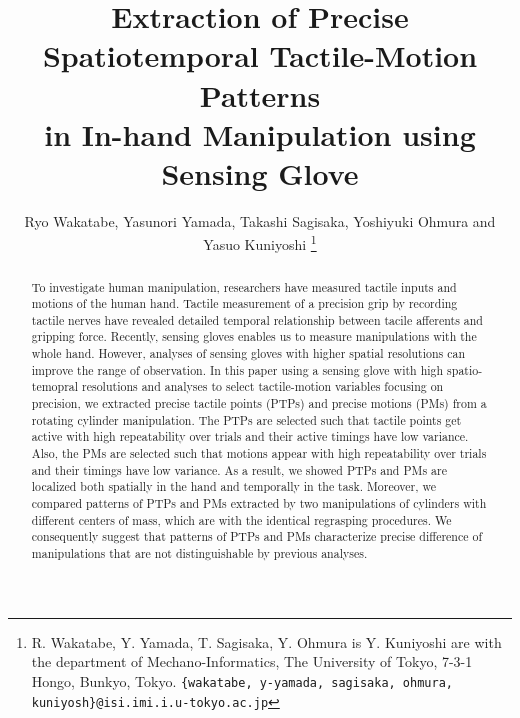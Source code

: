 \documentclass[letterpaper, 10 pt, conference]{IEEEtran}  %
\title{\LARGE \bf
Extraction of Precise Spatiotemporal Tactile-Motion Patterns \\ 
in In-hand Manipulation using Sensing Glove
}
\author{Ryo Wakatabe, Yasunori Yamada, Takashi Sagisaka, Yoshiyuki Ohmura and Yasuo Kuniyoshi%
    \thanks{R. Wakatabe, Y. Yamada, T. Sagisaka, Y. Ohmura is Y. Kuniyoshi are with the department of Mechano-Informatics, The University of Tokyo, 7-3-1 Hongo, Bunkyo, Tokyo.  {\tt\small \{wakatabe, y-yamada, sagisaka, ohmura, kuniyosh\}@isi.imi.i.u-tokyo.ac.jp}}%
}
\begin{document}
\maketitle
\thispagestyle{empty}
\pagestyle{empty}

\begin{abstract}
To investigate human manipulation, researchers have measured tactile inputs and motions of the human hand.
Tactile measurement of a precision grip by recording tactile nerves have revealed detailed temporal relationship between tacile afferents and gripping force. Recently, sensing gloves enables us to measure manipulations with the whole hand. However, analyses of sensing gloves with higher spatial resolutions can improve the range of observation.
In this paper using a sensing glove with high spatio-temopral resolutions and analyses to select tactile-motion variables focusing on precision, we extracted precise tactile points (PTPs) and precise motions (PMs) from a rotating cylinder manipulation. The PTPs are selected such that tactile points get active with high repeatability over trials and their active timings have low variance. Also, the PMs are selected such that motions appear with high repeatability over trials and their timings have low variance. As a result, we showed PTPs and PMs are localized both spatially in the hand and temporally in the task. Moreover, we compared patterns of PTPs and PMs extracted by two manipulations of cylinders with different centers of mass, which are with the identical regrasping procedures. We consequently suggest that patterns of PTPs and PMs characterize precise difference of manipulations that are not distinguishable by previous analyses.



\end{abstract}
\end{document}
